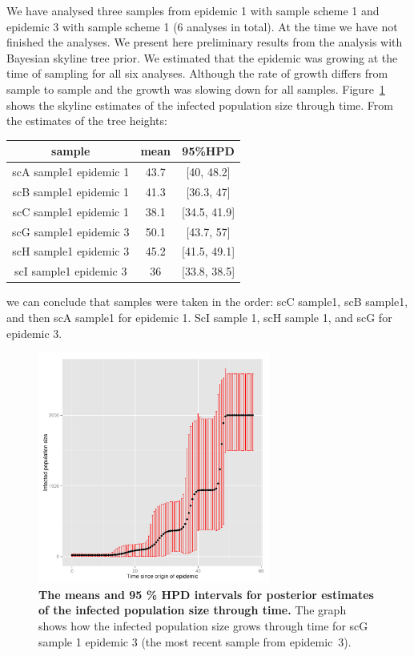 \documentclass[12pt]{article}
\begin{document}
We have analysed three samples from epidemic 1 with sample scheme 1 and epidemic 3 with sample scheme 1 (6 analyses in total). At the time we have not finished the analyses. We present here preliminary results from the analysis with Bayesian skyline tree prior. We estimated that the epidemic was growing at the time of sampling for all six analyses. Although the rate of growth differs from sample to sample and the growth was slowing down for all samples. Figure~\ref{fig: popSize} shows the skyline estimates of the infected population size through time.  From the estimates of the tree heights:

\vskip2mm

\begin{tabular} {ccc}
sample & mean & 95\%HPD \\
\hline
scA sample1 epidemic 1 & 43.7 & [40, 48.2] \\
scB sample1 epidemic 1 & 41.3 & [36.3, 47] \\
scC sample1 epidemic 1 & 38.1 & [34.5, 41.9] \\
scG sample1 epidemic 3 & 50.1 & [43.7, 57] \\
scH sample1 epidemic 3 & 45.2 & [41.5, 49.1] \\
scI sample1 epidemic 3 & 36 & [33.8, 38.5]  \\
\end{tabular}

\vskip2mm

\noindent we can conclude that samples were taken in the order: scC sample1, scB sample1, and then scA sample1 for epidemic 1. ScI sample 1, scH sample 1, and  scG for epidemic 3. 

\begin{center} 
\begin{figure}[!h]
\includegraphics[width=3in]{popSize}
\caption{\footnotesize {\bf The means and 95 \% HPD intervals for posterior estimates of the infected population size through time.} 
The graph shows how the infected population size  grows through time for scG sample 1 epidemic 3 (the most recent sample from epidemic~3).} 
\label{fig: popSize} 
\end{figure}
\end{center} 
\end{document}
